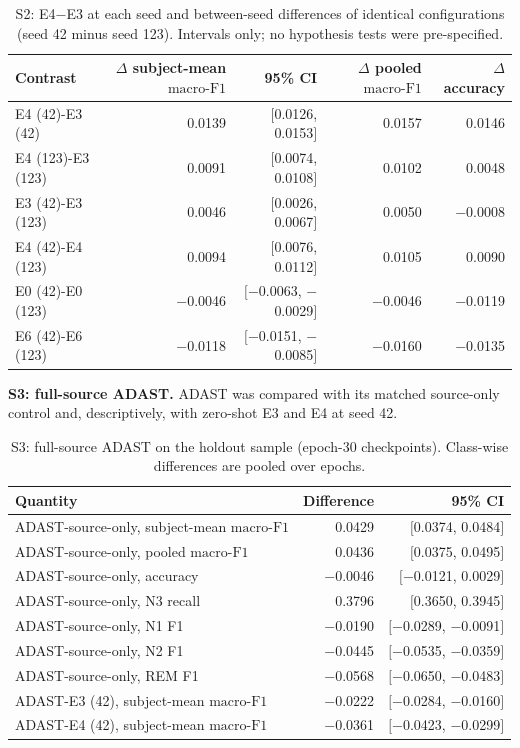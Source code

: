 \documentclass[10pt,a4paper]{article}
\newcommand{\mf}{\ensuremath{\mathrm{macro\text{-}F1}}}
\newcommand{\ci}{95\% CI}
\begin{document}
\begin{table}[H]
\centering\small
\caption{S2: E4$-$E3 at each seed and between-seed differences of identical configurations (seed 42
minus seed 123). Intervals only; no hypothesis tests were pre-specified.}
\label{tab:sup_holdout_s2}
\begin{tabular}{lrrrr}
\toprule
Contrast & $\Delta$ subject-mean \mf & \ci & $\Delta$ pooled \mf & $\Delta$ accuracy \\
\midrule
E4 (42)-E3 (42) & 0.0139 & $[$0.0126, 0.0153$]$ & 0.0157 & 0.0146 \\
E4 (123)-E3 (123) & 0.0091 & $[$0.0074, 0.0108$]$ & 0.0102 & 0.0048 \\
E3 (42)-E3 (123) & 0.0046 & $[$0.0026, 0.0067$]$ & 0.0050 & $-$0.0008 \\
E4 (42)-E4 (123) & 0.0094 & $[$0.0076, 0.0112$]$ & 0.0105 & 0.0090 \\
E0 (42)-E0 (123) & $-$0.0046 & $[$$-$0.0063, $-$0.0029$]$ & $-$0.0046 & $-$0.0119 \\
E6 (42)-E6 (123) & $-$0.0118 & $[$$-$0.0151, $-$0.0085$]$ & $-$0.0160 & $-$0.0135 \\
\bottomrule
\end{tabular}
\end{table}

\textbf{S3: full-source ADAST.} ADAST was compared with its matched source-only control and,
descriptively, with zero-shot E3 and E4 at seed 42.

\begin{table}[H]
\centering\small
\caption{S3: full-source ADAST on the holdout sample (epoch-30 checkpoints). Class-wise differences
are pooled over epochs.}
\label{tab:sup_holdout_s3}
\begin{tabular}{lrr}
\toprule
Quantity & Difference & \ci \\
\midrule
ADAST-source-only, subject-mean \mf & 0.0429 & $[$0.0374, 0.0484$]$ \\
ADAST-source-only, pooled \mf & 0.0436 & $[$0.0375, 0.0495$]$ \\
ADAST-source-only, accuracy & $-$0.0046 & $[$$-$0.0121, 0.0029$]$ \\
ADAST-source-only, N3 recall & 0.3796 & $[$0.3650, 0.3945$]$ \\
ADAST-source-only, N1 F1 & $-$0.0190 & $[$$-$0.0289, $-$0.0091$]$ \\
ADAST-source-only, N2 F1 & $-$0.0445 & $[$$-$0.0535, $-$0.0359$]$ \\
ADAST-source-only, REM F1 & $-$0.0568 & $[$$-$0.0650, $-$0.0483$]$ \\
\addlinespace
ADAST-E3 (42), subject-mean \mf & $-$0.0222 & $[$$-$0.0284, $-$0.0160$]$ \\
ADAST-E4 (42), subject-mean \mf & $-$0.0361 & $[$$-$0.0423, $-$0.0299$]$ \\
\bottomrule
\end{tabular}
\end{table}
\end{document}
